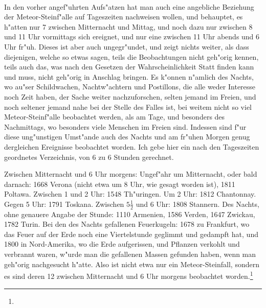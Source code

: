 \documentclass[a4paper, 11pt, oneside, polutonikogreek, german]{article}
\begin{document}
\paragraph{}
In den vorher angef"uhrten Aufs"atzen hat man auch eine angebliche Beziehung der Meteor-Steinf"alle auf Tageszeiten nachweisen wollen, und behauptet, es h"atten nur 7 zwischen Mitternacht und Mittag, und noch dazu nur zwischen 8 und 11 Uhr vormittags sich ereignet, und nur eine zwischen 11 Uhr abends und 6 Uhr fr"uh. Dieses ist aber auch ungegr"undet, und zeigt nichts weiter, als dass diejenigen, welche so etwas sagen, teils die Beobachtungen nicht geh"orig kennen, teils auch das, was nach den Gesetzen der Wahrscheinlichkeit Statt finden kann und muss, nicht geh"orig in Anschlag bringen. Es k"onnen n"amlich des Nachts, wo au"ser Schildwachen, Nachtw"achtern und Postillons, die alle weder Interesse noch Zeit haben, der Sache weiter nachzuforschen, selten jemand im Freien, und noch seltener jemand nahe bei der Stelle des Falles ist, bei weitem nicht so viel Meteor-Steinf"alle beobachtet werden, als am Tage, und besonders des Nachmittags, wo besonders viele Menschen im Freien sind. Indessen sind f"ur diese ung"unstigen Umst"ande auch des Nachts und am fr"uhen Morgen genug dergleichen Ereignisse beobachtet worden. Ich gebe hier ein nach den Tageszeiten geordnetes Verzeichnis, von 6 zu 6 Stunden gerechnet.

Zwischen Mitternacht und 6 Uhr morgens: Ungef"ahr um Mitternacht, oder bald darnach: 1668 Verona (nicht etwa um 8 Uhr, wie gesagt worden ist), 1811 Poltawa. Zwischen 1 und 2 Uhr: 1548 Th"uringen. Um 2 Uhr: 1812 Chantonnay. Gegen 5 Uhr: 1791 Toskana. Zwischen $\mathfrak{5\frac{1}{2}}$ und 6 Uhr: 1808 Stannern. Des Nachts, ohne genauere Angabe der Stunde: 1110 Armenien, 1586 Verden, 1647 Zwickau, 1782 Turin. Bei den des Nachts gefallenen Feuerkugeln: 1678 zu Frankfurt, wo das Feuer auf der Erde noch eine Viertelstunde geglimmt und gedampft hat, und 1800 in Nord-Amerika, wo die Erde aufgerissen, und Pflanzen verkohlt und verbrannt waren, w"urde man die gefallenen Massen gefunden haben, wenn man geh"orig nachgesucht h"atte. Also ist nicht etwa nur ein Meteor-Steinfall, sondern es sind deren 12 zwischen Mitternacht und 6 Uhr morgens beobachtet worden.\footnote{}
\end{document}
